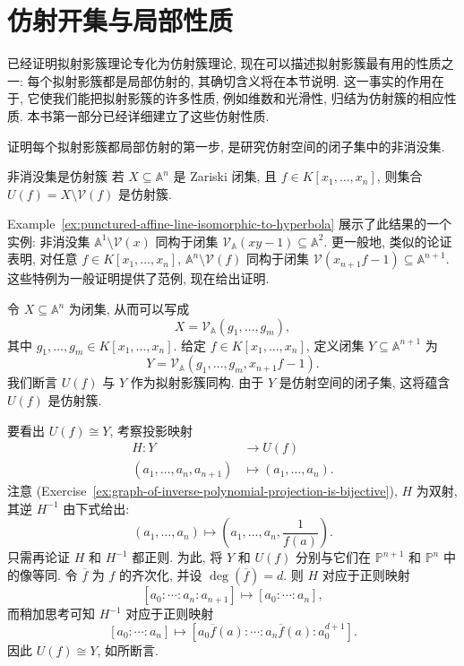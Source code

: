 \section{仿射开集与局部性质}\label{sec:affine-opens-and-local-properties}

已经证明拟射影簇理论专化为仿射簇理论, 现在可以描述拟射影簇最有用的性质之一: 每个拟射影簇都是\textquotedbl{}局部仿射\textquotedbl{}的, 其确切含义将在本节说明. 这一事实的作用在于, 它使我们能把拟射影簇的许多性质, 例如维数和光滑性, 归结为仿射簇的相应性质. 本书第一部分已经详细建立了这些仿射性质.

证明每个拟射影簇都局部仿射的第一步, 是研究仿射空间的闭子集中的非消没集.

\begin{Proposition}{非消没集是仿射簇}\leavevmode\label{prop:nonvanishing-sets-in-affine-closed-sets-are-affine}
若 $X\subseteq\mathbb{A}^{n}$ 是 Zariski 闭集, 且 $f\in K[x_{1},\ldots,x_{n}]$, 则集合 $U(f)=X\setminus\mathcal{V}(f)$ 是仿射簇.
\end{Proposition}

Example~\ref{ex:punctured-affine-line-isomorphic-to-hyperbola} 展示了此结果的一个实例: 非消没集 $\mathbb{A}^{1}\setminus\mathcal{V}(x)$ 同构于闭集 $\mathcal{V}_{\mathbb{A}}(xy-1)\subseteq\mathbb{A}^{2}$. 更一般地, 类似的论证表明, 对任意 $f\in K[x_{1},\ldots,x_{n}]$, $\mathbb{A}^{n}\setminus\mathcal{V}(f)$ 同构于闭集 $\mathcal{V}(x_{n+1}f-1)\subseteq\mathbb{A}^{n+1}$. 这些特例为一般证明提供了范例, 现在给出证明.

\begingroup
\renewcommand{\AJProofBegin}{%
  \par\addvspace{\topsep}\noindent
  {\sffamily\bfseries\CJKfamily{pffont}Proof of Proposition~\ref{prop:nonvanishing-sets-in-affine-closed-sets-are-affine}}\enspace\ignorespaces
}
\begin{Proof}
令 $X\subseteq\mathbb{A}^{n}$ 为闭集, 从而可以写成
\[
  X=\mathcal{V}_{\mathbb{A}}(g_{1},\ldots,g_{m}),
\]
其中 $g_{1},\ldots,g_{m}\in K[x_{1},\ldots,x_{n}]$. 给定 $f\in K[x_{1},\ldots,x_{n}]$, 定义闭集 $Y\subseteq\mathbb{A}^{n+1}$ 为
\[
  Y=\mathcal{V}_{\mathbb{A}}(g_{1},\ldots,g_{m},x_{n+1}f-1).
\]
我们断言 $U(f)$ 与 $Y$ 作为拟射影簇同构. 由于 $Y$ 是仿射空间的闭子集, 这将蕴含 $U(f)$ 是仿射簇.

要看出 $U(f)\cong Y$, 考察投影映射
\[
  \begin{aligned}
    H:Y&\to U(f)\\
    (a_{1},\ldots,a_{n},a_{n+1})&\mapsto(a_{1},\ldots,a_{n}).
  \end{aligned}
\]
注意 (Exercise~\ref{ex:graph-of-inverse-polynomial-projection-is-bijective}), $H$ 为双射, 其逆 $H^{-1}$ 由下式给出:
\[
  (a_{1},\ldots,a_{n})\mapsto\left(a_{1},\ldots,a_{n},\frac{1}{f(a)}\right).
\]
只需再论证 $H$ 和 $H^{-1}$ 都正则. 为此, 将 $Y$ 和 $U(f)$ 分别与它们在 $\mathbb{P}^{n+1}$ 和 $\mathbb{P}^{n}$ 中的像等同. 令 $\overline{f}$ 为 $f$ 的齐次化, 并设 $\deg(\overline{f})=d$. 则 $H$ 对应于正则映射
\[
  [a_{0}:\cdots:a_{n}:a_{n+1}]\mapsto[a_{0}:\cdots:a_{n}],
\]
而稍加思考可知 $H^{-1}$ 对应于正则映射
\[
  [a_{0}:\cdots:a_{n}]\mapsto[a_{0}\overline{f}(a):\cdots:a_{n}\overline{f}(a):a_{0}^{d+1}].
\]
因此 $U(f)\cong Y$, 如所断言.
\end{Proof}
\endgroup

